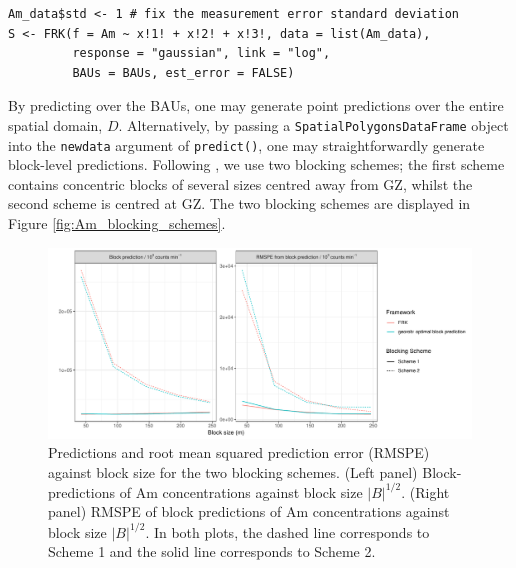 \documentclass[12pt,a4paper]{article}
\begin{document}
\begin{minipage}{\linewidth}
\begin{lstlisting}[style=R]
Am_data$std <- 1 # fix the measurement error standard deviation
S <- FRK(f = Am ~ x!1! + x!2! + x!3!, data = list(Am_data),
         response = "gaussian", link = "log",
         BAUs = BAUs, est_error = FALSE) 
\end{lstlisting}
\end{minipage}



By predicting over the BAUs, one may generate point predictions over the entire spatial domain, $D$. %
Alternatively, by passing a \texttt{SpatialPolygonsDataFrame} object into the \texttt{newdata} argument of \texttt{predict()}, one may straightforwardly generate block-level predictions.
Following \cite{Paul_Cressie_2011_lognormal_kriging_block_prediction}, we use two blocking schemes; the first scheme contains concentric blocks of several sizes centred away from GZ, whilst the second scheme is centred at GZ. 
The two blocking schemes are displayed in Figure \ref{fig:Am_blocking_schemes}.




\begin{figure}
    \centering
    \includegraphics[width = \linewidth]{Images/Americium_comparison_plot_FRK_georob.pdf}
    \caption{Predictions and root mean squared prediction error (RMSPE) against block size for the two blocking schemes. (Left panel) Block-predictions of Am concentrations against block size $|B|^{1/2}$.  (Right panel) RMSPE of block predictions of Am concentrations against block size $|B|^{1/2}$. In both plots, the dashed line corresponds to Scheme 1 and the solid line
    corresponds to Scheme 2.
}   
  \label{fig:Americium_block_preds_by_size}
\end{figure}
\end{document}
